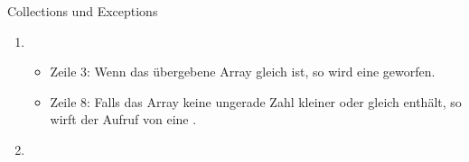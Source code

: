 \documentclass{../tuda-exercise}
\begin{document}
\begin{task}[credit=\stars{1}{3}]{Collections und Exceptions}
\begin{solution}
      \begin{enumerate}
        [label=(2.\arabic*)]
        \item
        \begin{itemize}
          \item Zeile 3: Wenn das übergebene Array gleich  ist, so wird eine
           geworfen.
          \item Zeile 8: Falls das Array keine ungerade Zahl kleiner oder gleich 
          enthält, so wirft der Aufruf von
          \href{https://docs.oracle.com/en/java/javase/11/docs/api/java.base/java/util/LinkedList.html#getLast()}
          {} eine .
        \end{itemize}
        \item\hfill
        
      \end{enumerate}
    \end{solution}
  \end{task}

  \clearpage
\end{document}
